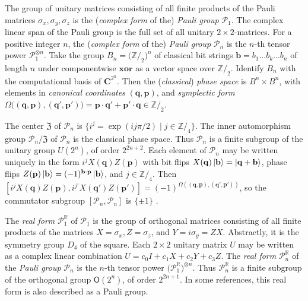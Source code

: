 \documentclass[12pt,a4paper]{amsart}
\numberwithin{equation}{section}
\theoremstyle{plain}
\theoremstyle{definition}
\begin{document}
The group of unitary matrices consisting of all finite products of the Pauli matrices $\sigma_x, \sigma_y, \sigma_z$ is the (\emph{complex form} of the) \emph{Pauli group} $\mathcal P_1$. The complex linear span of the Pauli group is the full set of all unitary $2\times 2$-matrices. For a positive integer $n$, the (\emph{complex form} of the) \emph{Pauli group} $\mathcal P_n$ is the $n$-th tensor power $\mathcal P_1^{\otimes n}$. Take the group $B_n=\big(\mathbb Z/_2\big)^n$ of classical bit strings $\mathbf b=b_1\ldots b_k\ldots b_n$ of length $n$ under componentwise $\mathbf{xor}$ as a vector space over $\mathbb Z/_2$. Identify $B_n$ with the computational basis of $\mathbf C^{2^n}$. Then the (\emph{classical}) \emph{phase space} is $B^n\times B^n$, with elements in \emph{canonical coordinates} $(\mathbf q,\mathbf p)$, and  \emph{symplectic form} $\Omega\big((\mathbf q,\mathbf p),(\mathbf q',\mathbf p')\big)=\mathbf p\cdot\mathbf q'+\mathbf p'\cdot\mathbf q
\in\mathbb Z/_2
$.


The center $\mathfrak Z$
of $\mathcal P_n$ is $\{i^j=\exp(ij\pi/2)\mid j\in\mathbb Z/_4\}$. The inner automorphism group $\mathcal P_n/\mathfrak Z$ of $\mathcal P_n$ is the classical phase space. Thus $\mathcal P_n$ is a finite subgroup of the unitary group $U(2^n)$, of order $2^{2n+2}$. Each element of $\mathcal P_n$ may be written uniquely in the form
$
i^jX(\mathbf q)Z(\mathbf p)
$
with bit flips $X(\mathbf q)\ket{\mathbf b}=\ket{\mathbf q+\mathbf b}$, phase flips $Z(\mathbf p)\ket{\mathbf b}=(-1)^{\mathbf b\cdot\mathbf p}\ket{\mathbf b}$, and $j\in\mathbb Z/_4$. Then $[i^jX(\mathbf q)Z(\mathbf p),i^{j'}X(\mathbf q')Z(\mathbf p')]=(-1)^{\Omega((\mathbf q,\mathbf p),(\mathbf q',\mathbf p'))}$, so the commutator subgroup  $[\mathcal P_n,\mathcal P_n]$ is $\{\pm1\}$ \cite{CalRainsShorSloane}.



The \emph{real form} ${\mathcal P}_1^\mathbb R$ of $\mathcal P_1$ is the group of orthogonal matrices consisting of all finite products of the matrices $X=\sigma_x, Z=\sigma_z$, and $Y=i\sigma_y=ZX$. Abstractly, it is the symmetry group $D_4$ of the square. Each $2\times 2$ unitary matrix $U$ may be written as a complex linear combination $U=c_0I+c_1X+c_2Y+c_3Z$. The \emph{real form} ${\mathcal P}_n^\mathbb R$ of the \emph{Pauli group} $\mathcal P_n$ is the $n$-th tensor power $\big({\mathcal P}_1^\mathbb R\big)^{\otimes n}$. Thus ${\mathcal P}_n^\mathbb R$ is a finite subgroup of the orthogonal group $\mathsf O(2^n)$, of order $2^{2n+1}$. In some references, this real form is also described as a Pauli group.
\end{document}
